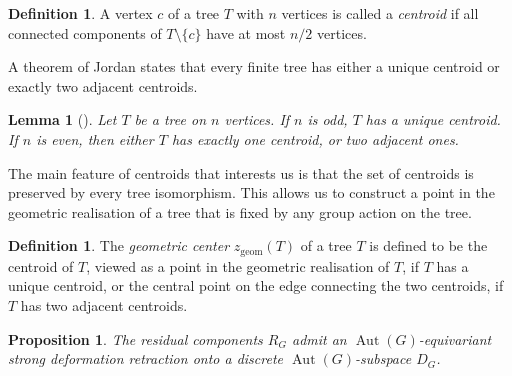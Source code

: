 \documentclass[reqno,dvipsnames]{amsart}
\theoremstyle{plain}
\newtheorem{lemma}[theorem]{Lemma}
\newtheorem{proposition}[theorem]{Proposition}
\numberwithin{equation}{section}
\theoremstyle{definition}
\newtheorem{definition}[theorem]{Definition}
\DeclareMathOperator{\Aut}{Aut}
\begin{document}
\begin{definition}\label{def:centroid}
	A vertex $c$ of a tree $T$ with $n$ vertices is called a \textit{centroid} if all connected components of $T\setminus \{c\}$ have at most $n/2$ vertices.
\end{definition}

A theorem of Jordan \cite{Centroid} states that every finite tree has either a unique centroid or exactly two adjacent centroids. 

\begin{lemma}[\cite{Centroid}]\label{existenceofcentral}
	Let $T$ be a tree on $n$ vertices. If $n$ is odd, $T$ has a unique centroid. If $n$ is even, then either $T$ has exactly one centroid, or two adjacent ones.
\end{lemma}

The main feature of centroids that interests us is that the set of centroids is preserved by every tree isomorphism. This allows us to construct a point in the geometric realisation of a tree that is fixed by any group action on the tree.

\begin{definition}
	The \textit{geometric center} $z_\mathrm{geom}(T)$ of a tree $T$ is defined to be the centroid of $T$, viewed as a point in the geometric realisation of $T$, if $T$ has a unique centroid, or the central point on the edge connecting the two centroids, if $T$ has two adjacent centroids.
\end{definition}

\begin{proposition}
	The residual components $R_G$ admit an $\Aut(G)$-equivariant strong deformation retraction onto a discrete $\Aut(G)$-subspace $D_G$.
\end{proposition}	
\end{document}
